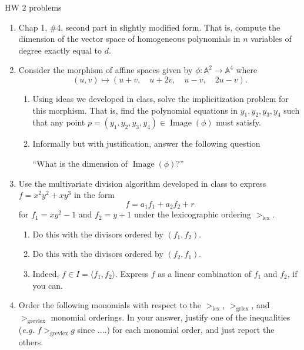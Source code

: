 \documentclass[11pt]{report}
\newcommand\A{{\mathbb A}}
\newcommand\image{\operatorname{Image}}
\newcommand\lex{>_{\operatorname{lex}}}
\newcommand\grlex{>_{\operatorname{grlex}}}
\newcommand\grevlex{>_{\operatorname{grevlex}}}
\begin{document}
{\LARGE HW 2 problems}

\vskip 1cm

\begin{enumerate}

\item Chap 1, \#4, second part in slightly modified form.  That is, compute the dimension of the vector space of
homogeneous polynomials in $n$ variables of degree exactly equal to $d$.

\item Consider the morphism of affine spaces given by $\phi: \A^2 \to \A^4$ where
$$
(u, v) \mapsto (u+v, \quad u + 2v, \quad u-v, \quad 2u-v ).
$$

\smallskip

\begin{enumerate}

\item Using ideas we developed in class, solve the implicitization problem for this morphism.  That is,
find the polynomial equations in $y_1, y_2, y_3, y_4$ such that any point $p = (y_1, y_2, y_3, y_4) \in
\image(\phi)$ must satisfy.

\item Informally but with justification, answer the following question

\smallskip

\centerline{``What is the dimension of $\image(\phi)$?''}

\end{enumerate}

\item Use the multivariate division algorithm developed in class to express $f = x^2 y^2 + xy^3$ in
the form 
$$f = a_1 f_1 + a_2 f_2 +r$$ 
for $f_1 = xy^2 - 1$ and $f_2 = y+1$ under the lexicographic ordering $\lex$.

\begin{enumerate}

\item Do this with the divisors ordered by $(f_1, f_2)$.

\item Do this with the divisors ordered by $(f_2, f_1)$.

\item Indeed, $f \in I = \langle f_1, f_2 \rangle$. Express $f$ as a linear combination
of $f_1$ and $f_2$, if you can.

\end{enumerate}

\item Order the following monomials with respect to the $\lex$, $\grlex$, and $\grevlex$ monomial
orderings.  In your answer, justify one of the inequalities (\emph{e.g.} $f \grevlex g$ since ....)
for each monomial order, and just report the others.


\end{enumerate}
\end{document}
